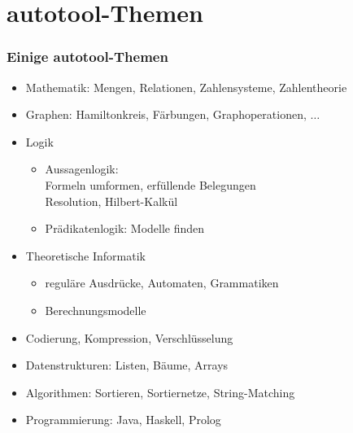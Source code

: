 \section{autotool-Themen}
\begin{frame}
  \frametitle{Einige autotool-Themen}
  { \small
    \begin{itemize}
    \item Mathematik: Mengen, Relationen, Zahlensysteme, Zahlentheorie
    \item Graphen: Hamiltonkreis, Färbungen, Graphoperationen, $\ldots$
    \item Logik
      \begin{itemize}
      \item Aussagenlogik: 
        \\ Formeln umformen, erfüllende Belegungen
        \\ Resolution, Hilbert-Kalkül
      \item Prädikatenlogik: Modelle finden
      \end{itemize}
    \item Theoretische Informatik
      \begin{itemize}
      \item reguläre Ausdrücke, Automaten, Grammatiken
      \item Berechnungsmodelle
      \end{itemize}
    \item Codierung, Kompression, Verschlüsselung
    \item Datenstrukturen: Listen, Bäume, Arrays 
    \item Algorithmen: Sortieren, Sortiernetze, String-Matching
    \item Programmierung: Java, Haskell, Prolog
    \end{itemize}
  }
\end{frame}
